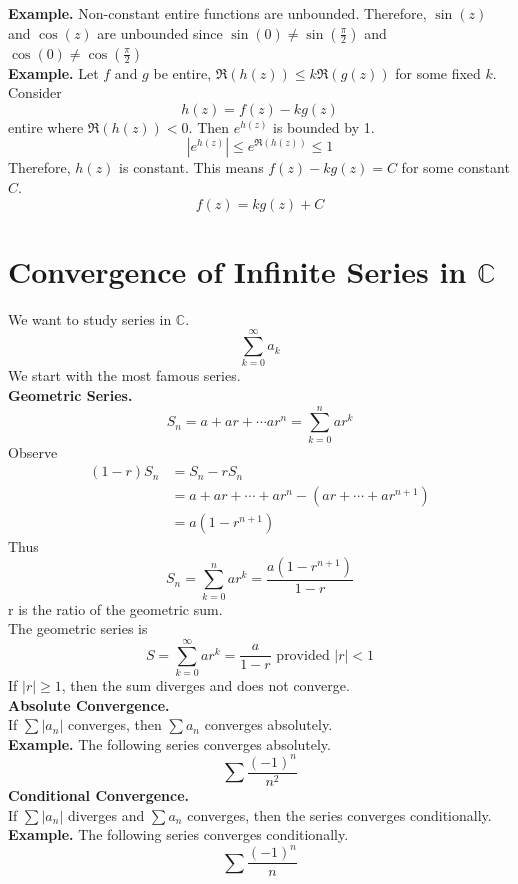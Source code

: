 \documentclass[11pt]{article}
\begin{document}
\newline
\textbf{Example.} Non-constant entire functions are unbounded. Therefore, $\sin(z)$ and $\cos(z)$ are unbounded since $\sin(0) \neq \sin(\frac{\pi}{2})$ and $\cos(0) \neq \cos(\frac{\pi}{2})$ \\
\newline
\textbf{Example.} Let $f$ and $g$ be entire, $\Re(h(z)) \leqslant k\Re(g(z))$ for some fixed $k$. Consider 
$$h(z) = f(z) - kg(z)$$ entire where $\Re(h(z)) < 0$. Then $e^{h(z)}$ is bounded by 1. 
$$|e^{h(z)}| \leqslant e^{\Re(h(z))} \leqslant 1$$
Therefore, $h(z)$ is constant. This means $f(z) - kg(z) = C$ for some constant $C$. 
$$f(z) = kg(z) + C$$

\newpage
\section{Convergence of Infinite Series in $\mathbb{C}$}
We want to study series in $\mathbb{C}$. 
$$\sum_{k = 0}^{\infty}a_k$$
We start with the most famous series. \\
\newline
\textbf{Geometric Series.}
$$S_n = a + ar + \cdots ar^n = \sum_{k = 0}^n ar^k$$
Observe 
\begin{align*}
(1 - r)S_n &= S_n - rS_n \\ 
&= a + ar + \cdots + ar^n - (ar + \cdots + ar^{n + 1}) \\ 
&= a(1 - r^{n + 1})
\end{align*}
Thus 
$$S_n = \sum_{k = 0}^n ar^k = \frac{a(1-r^{n + 1})}{1 - r}$$
r is the ratio of the geometric sum. \\
The geometric series is 
\begin{equation*}
S = \sum_{k = 0}^{\infty}ar^k = \frac{a}{1 - r} \mbox{ provided } |r| < 1
\end{equation*}
If $|r| \geqslant 1$, then the sum diverges and does not converge. \\
\newline
\textbf{Absolute Convergence.} \\
If $\sum {|a_n|}$ converges, then $\sum {a_n}$ converges absolutely. \\
\newline
\textbf{Example.} The following series converges absolutely. 
$$\sum \frac{(-1)^n}{n^2}$$ 
\textbf{Conditional Convergence.} \\
If $\sum {|a_n|}$ diverges and $\sum {a_n}$ converges, then the series converges conditionally. \\
\newline 
\textbf{Example.} The following series converges conditionally. 
$$ \sum \frac{(-1)^n}{n}$$
\newpage
\end{document}
